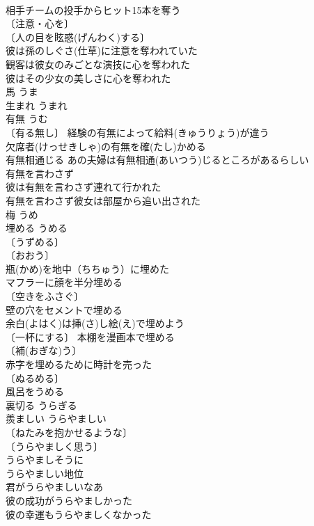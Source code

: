 \documentclass[8pt]{extreport}
\begin{document}
\begin{CJK}{UTF8}{min}
\\	相手チームの投手からヒット15本を奪う 
\\	〔注意・心を〕
\\	〔人の目を眩惑(げんわく)する〕
\\	彼は孫のしぐさ(仕草)に注意を奪われていた 
\\	観客は彼女のみごとな演技に心を奪われた 
\\	彼はその少女の美しさに心を奪われた 
\\	馬	うま	
\\	生まれ	うまれ	
\\	有無	うむ	
\\	〔有る無し〕 経験の有無によって給料(きゅうりょう)が違う 
\\	欠席者(けっせきしゃ)の有無を確(たし)かめる 
\\	有無相通じる あの夫婦は有無相通(あいつう)じるところがあるらしい 
\\	有無を言わさず 
\\	彼は有無を言わさず連れて行かれた 
\\	有無を言わさず彼女は部屋から追い出された 
\\	梅	うめ	
\\	埋める	うめる	
\\	〔うずめる〕
\\	〔おおう〕
\\	瓶(かめ)を地中（ちちゅう）に埋めた 
\\	マフラーに顔を半分埋める 
\\	〔空きをふさぐ〕
\\	壁の穴をセメントで埋める 
\\	余白(よはく)は挿(さ)し絵(え)で埋めよう 
\\	〔一杯にする〕 本棚を漫画本で埋める 
\\	〔補(おぎな)う〕
\\	赤字を埋めるために時計を売った 
\\	〔ぬるめる〕　
\\	風呂をうめる 
\\	裏切る	うらぎる	
\\	羨ましい	うらやましい	
\\	〔ねたみを抱かせるような〕
\\	〔うらやましく思う〕
\\	うらやましそうに 
\\	うらやましい地位 
\\	君がうらやましいなあ 
\\	彼の成功がうらやましかった 
\\	彼の幸運もうらやましくなかった 

\end{CJK}
\end{document}
